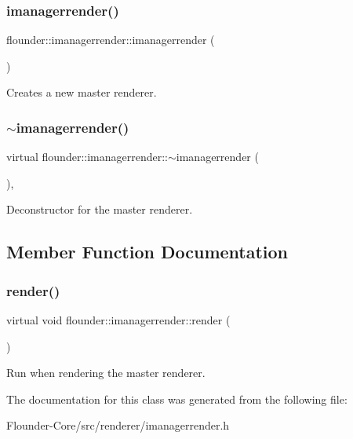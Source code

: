 \subsubsection{\texorpdfstring{imanagerrender()}{imanagerrender()}}
{\footnotesize\ttfamily flounder\+::imanagerrender\+::imanagerrender (\begin{DoxyParamCaption}{ }\end{DoxyParamCaption})\hspace{0.3cm}{\ttfamily [inline]}}



Creates a new master renderer. 

\mbox{\label{classflounder_1_1imanagerrender_abcc4d43e01ff6315c58a9df1b091aca0}} 
\subsubsection{\texorpdfstring{$\sim$imanagerrender()}{~imanagerrender()}}
{\footnotesize\ttfamily virtual flounder\+::imanagerrender\+::$\sim$imanagerrender (\begin{DoxyParamCaption}{ }\end{DoxyParamCaption})\hspace{0.3cm}{\ttfamily [inline]}, {\ttfamily [virtual]}}



Deconstructor for the master renderer. 



\subsection{Member Function Documentation}
\mbox{\label{classflounder_1_1imanagerrender_a7cb8095219bd72cd974043adcbc908b4}} 
\subsubsection{\texorpdfstring{render()}{render()}}
{\footnotesize\ttfamily virtual void flounder\+::imanagerrender\+::render (\begin{DoxyParamCaption}{ }\end{DoxyParamCaption})\hspace{0.3cm}{\ttfamily [pure virtual]}}



Run when rendering the master renderer. 



The documentation for this class was generated from the following file\+:\begin{DoxyCompactItemize}
\item 
Flounder-\/\+Core/src/renderer/imanagerrender.\+h\end{DoxyCompactItemize}
